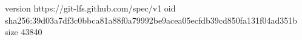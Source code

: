 version https://git-lfs.github.com/spec/v1
oid sha256:39d03a7df3c0bbca81a88f0a79992be9acea05ecfdb39cd850fa131f04ad351b
size 43840
